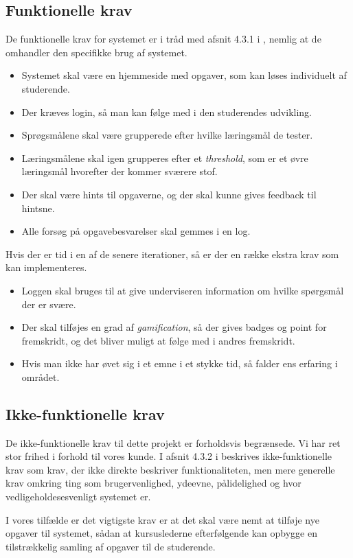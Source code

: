 \documentclass[12pt]{article}
\begin{document}
\subsection{Funktionelle krav}
De funktionelle krav for systemet er i tråd med afsnit 4.3.1 i \cite{OOSE}, nemlig at de omhandler den specifikke brug af systemet.
\begin{itemize}
    \item Systemet skal være en hjemmeside med opgaver, som kan løses individuelt af studerende.
    \item Der kræves login, så man kan følge med i den studerendes udvikling.
    \item Sprøgsmålene skal være grupperede efter hvilke læringsmål de tester.
    \item Læringsmålene skal igen grupperes efter et \emph{threshold}, som er et øvre læringsmål hvorefter der kommer sværere stof.
    \item Der skal være hints til opgaverne, og der skal kunne gives feedback til hintsne.
    \item Alle forsøg på opgavebesvarelser skal gemmes i en log.
\end{itemize}
Hvis der er tid i en af de senere iterationer, så er der en række ekstra krav som kan implementeres.
\begin{itemize}
    \item Loggen skal bruges til at give underviseren information om hvilke spørgsmål der er svære.
    \item Der skal tilføjes en grad af \emph{gamification}, så der gives badges og point for fremskridt, og det bliver muligt at følge med i andres fremskridt.
    \item Hvis man ikke har øvet sig i et emne i et stykke tid, så falder ens erfaring i området.
\end{itemize}
\subsection{Ikke-funktionelle krav}
De ikke-funktionelle krav til dette projekt er forholdsvis begrænsede. Vi har ret stor frihed i forhold til vores kunde. I afsnit 4.3.2 i \cite{OOSE} beskrives ikke-funktionelle krav som krav, der ikke direkte beskriver funktionaliteten, men mere generelle krav omkring ting som brugervenlighed, ydeevne, pålidelighed og hvor vedligeholdesesvenligt systemet er.

I vores tilfælde er det vigtigste krav er at det skal være nemt at tilføje nye opgaver til systemet, sådan at kursuslederne efterfølgende kan opbygge en tilstrækkelig samling af opgaver til de studerende.
\end{document}
